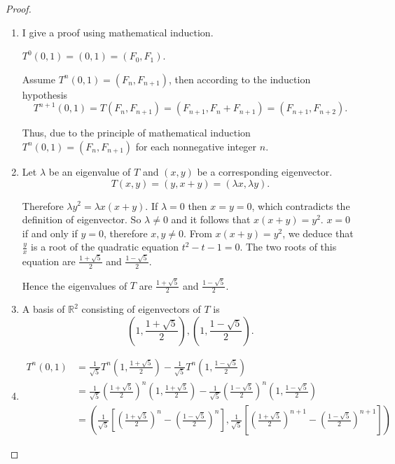 \begin{proof}
    \begin{enumerate}[label={(\alph*)}]
        \item I give a proof using mathematical induction.

              $T^{0}(0, 1) = (0, 1) = (F_{0}, F_{1})$.

              Assume $T^{n}(0, 1) = (F_{n}, F_{n+1})$, then according to the induction hypothesis
              \[
                  T^{n+1}(0, 1) = T(F_{n}, F_{n+1}) = (F_{n+1}, F_{n} + F_{n+1}) = (F_{n+1}, F_{n+2}).
              \]

              Thus, due to the principle of mathematical induction $T^{n}(0, 1) = (F_{n}, F_{n+1})$ for each nonnegative integer $n$.
        \item Let $\lambda$ be an eigenvalue of $T$ and $(x, y)$ be a corresponding eigenvector.
              \[
                  T(x, y) = (y, x + y) = (\lambda x, \lambda y).
              \]

              Therefore $\lambda y^{2} = \lambda x(x + y)$. If $\lambda = 0$ then $x = y = 0$, which contradicts the definition of eigenvector. So $\lambda\ne 0$ and it follows that $x(x + y) = y^{2}$. $x = 0$ if and only if $y = 0$, therefore $x, y\ne 0$. From $x(x + y) = y^{2}$, we deduce that $\frac{y}{x}$ is a root of the quadratic equation $t^{2} - t - 1 = 0$. The two roots of this equation are $\frac{1 + \sqrt{5}}{2}$ and $\frac{1 - \sqrt{5}}{2}$.

              Hence the eigenvalues of $T$ are $\frac{1 + \sqrt{5}}{2}$ and $\frac{1 - \sqrt{5}}{2}$.
        \item A basis of $\mathbb{R}^{2}$ consisting of eigenvectors of $T$ is
              \[
                  \left( 1, \frac{1+\sqrt{5}}{2} \right), \left( 1, \frac{1-\sqrt{5}}{2} \right).
              \]
        \item \begin{align*}
                  T^{n}(0, 1) & = \frac{1}{\sqrt{5}}T^{n}\left(1, \frac{1+\sqrt{5}}{2}\right) - \frac{1}{\sqrt{5}}T^{n}\left(1, \frac{1-\sqrt{5}}{2}\right)                                                                                                                                   \\
                              & = \frac{1}{\sqrt{5}}{\left(\frac{1+\sqrt{5}}{2}\right)}^{n}\left(1, \frac{1+\sqrt{5}}{2}\right) - \frac{1}{\sqrt{5}}{\left(\frac{1-\sqrt{5}}{2}\right)}^{n}\left(1, \frac{1-\sqrt{5}}{2}\right)                                                               \\
                              & = \left(\frac{1}{\sqrt{5}}\left[{\left(\frac{1 + \sqrt{5}}{2}\right)}^{n} - {\left(\frac{1 - \sqrt{5}}{2}\right)}^{n}\right], \frac{1}{\sqrt{5}}\left[{\left(\frac{1 + \sqrt{5}}{2}\right)}^{n+1} - {\left(\frac{1 - \sqrt{5}}{2}\right)}^{n+1}\right]\right)
              \end{align*}


\end{enumerate}
\end{proof}
